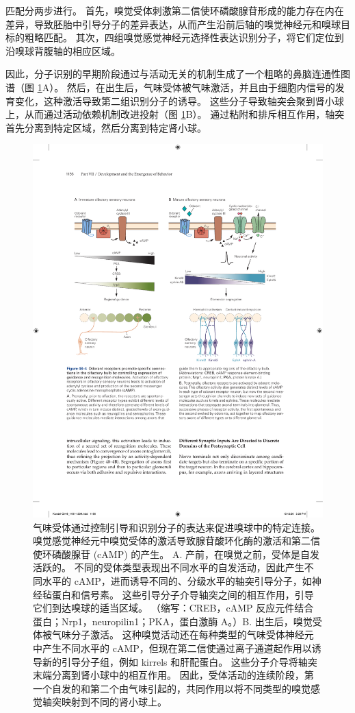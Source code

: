 匹配分两步进行。
首先，嗅觉受体刺激第二信使环磷酸腺苷形成的能力存在内在差异，导致胚胎中引导分子的差异表达，从而产生沿前后轴的嗅觉神经元和嗅球目标的粗略匹配。
其次，四组嗅觉感觉神经元选择性表达识别分子，将它们定位到沿嗅球背腹轴的相应区域。


因此，分子识别的早期阶段通过与活动无关的机制生成了一个粗略的鼻脑连通性图谱（图 \ref{fig:48_4}A）。
然后，在出生后，气味受体被气味激活，并且由于细胞内信号的发育变化，这种激活导致第二组识别分子的诱导。
这些分子导致轴突会聚到肾小球上，从而通过活动依赖机制改进投射（图 \ref{fig:48_4}B）。
通过粘附和排斥相互作用，轴突首先分离到特定区域，然后分离到特定肾小球。


\begin{figure}[htbp]
	\centering
	\includegraphics[width=0.9\linewidth]{chap48/fig_48_4}
	\caption{气味受体通过控制引导和识别分子的表达来促进嗅球中的特定连接。 嗅觉感觉神经元中嗅觉受体的激活导致腺苷酸环化酶的激活和第二信使环磷酸腺苷 (cAMP) 的产生。 A. 产前，在嗅觉之前，受体是自发活跃的。 不同的受体类型表现出不同水平的自发活动，因此产生不同水平的 cAMP，进而诱导不同的、分级水平的轴突引导分子，如神经毡蛋白和信号素。 这些引导分子介导轴突之间的相互作用，引导它们到达嗅球的适当区域。 （缩写：CREB，cAMP 反应元件结合蛋白；Nrp1，neuropilin1；PKA，蛋白激酶 A。）B. 出生后，嗅觉受体被气味分子激活。 这种嗅觉活动还在每种类型的气味受体神经元中产生不同水平的 cAMP，但现在第二信使通过离子通道起作用以诱导新的引导分子组，例如 kirrels 和肝配蛋白。 这些分子介导将轴突末端分离到肾小球中的相互作用。 因此，受体活动的连续阶段，第一个自发的和第二个由气味引起的，共同作用以将不同类型的嗅觉感觉轴突映射到不同的肾小球上。}
	\label{fig:48_4}
\end{figure}



